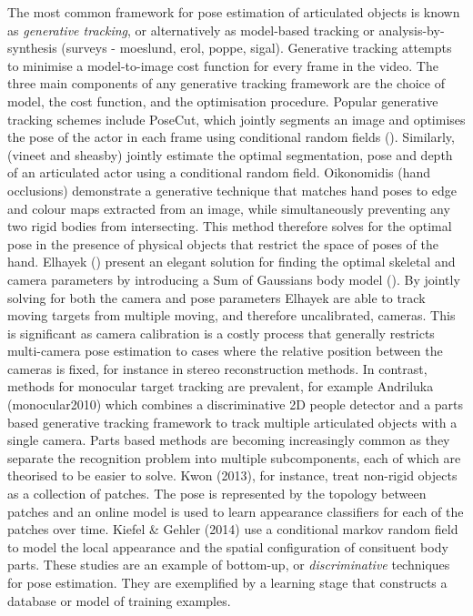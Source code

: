 The most common framework for pose estimation of articulated objects is known as \textit{generative tracking}, or alternatively as model-based tracking or analysis-by-synthesis (surveys - moeslund, erol, poppe, sigal). Generative tracking attempts to minimise a model-to-image cost function for every frame in the video. The three main components of any generative tracking framework are the choice of model, the cost function, and the optimisation procedure. Popular generative tracking schemes include PoseCut, which jointly segments an image and optimises the pose of the actor in each frame using conditional random fields (). Similarly, (vineet and sheasby) jointly estimate the optimal segmentation, pose and depth of an articulated actor using a conditional random field. Oikonomidis (hand occlusions) demonstrate a generative technique that matches hand poses to edge and colour maps extracted from an image, while simultaneously preventing any two rigid bodies from intersecting. This method therefore solves for the optimal pose in the presence of physical objects that restrict the space of poses of the hand. Elhayek () present an elegant solution for finding the optimal skeletal and camera parameters by introducing a Sum of Gaussians body model (). By jointly solving for both the camera and pose parameters Elhayek are able to track moving targets from multiple moving, and therefore uncalibrated, cameras. This is significant as camera calibration is a costly process that generally restricts multi-camera pose estimation to cases where the relative position between the cameras is fixed, for instance in stereo reconstruction methods. In contrast, methods for monocular target tracking are prevalent, for example Andriluka (monocular2010) which combines a discriminative 2D people detector and a parts based generative tracking framework to track multiple articulated objects with a single camera. Parts based methods are becoming increasingly common as they separate the recognition problem into multiple subcomponents, each of which are theorised to be easier to solve. Kwon (2013), for instance, treat non-rigid objects as a collection of patches. The pose is represented by the topology between patches and an online model is used to learn appearance classifiers for each of the patches over time. Kiefel \& Gehler (2014) use a conditional markov random field to model the local appearance and the spatial configuration of consituent body parts. These studies are an example of bottom-up, or \textit{discriminative} techniques for pose estimation. They are exemplified by a learning stage that constructs a database or model of training examples. 

